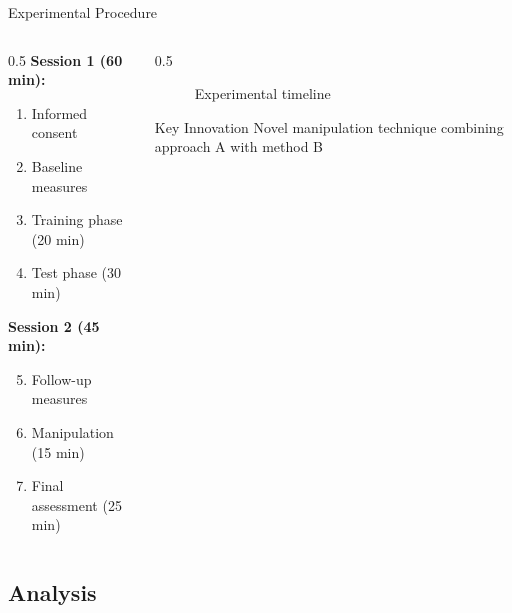 \documentclass[aspectratio=169,11pt]{beamer}
\begin{document}
\begin{frame}{Experimental Procedure}
  \begin{columns}[T]

    \begin{column}{0.5\textwidth}
      \textbf{Session 1 (60 min):}
      \begin{enumerate}
        \item Informed consent
        \item Baseline measures
        \item Training phase (20 min)
        \item Test phase (30 min)
      \end{enumerate}

      \vspace{0.5cm}

      \textbf{Session 2 (45 min):}
      \begin{enumerate}
        \setcounter{enumi}{4}
        \item Follow-up measures
        \item Manipulation (15 min)
        \item Final assessment (25 min)
      \end{enumerate}
    \end{column}

    \begin{column}{0.5\textwidth}
      \begin{figure}
        \centering
        \caption{Experimental timeline}
      \end{figure}

      \vspace{0.5cm}

      \begin{alertblock}{Key Innovation}
        Novel manipulation technique combining approach A with method B
      \end{alertblock}
    \end{column}

  \end{columns}
\end{frame}

\subsection{Analysis}
\end{document}
